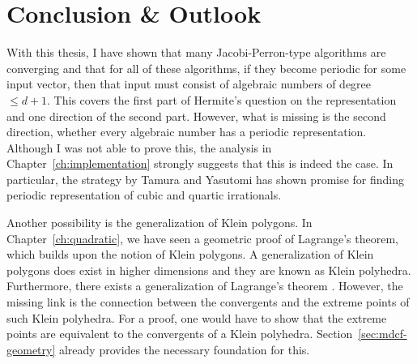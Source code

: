 \chapter{Conclusion \& Outlook}
\label{ch:conclusion}

With this thesis,
I have shown that many Jacobi-Perron-type algorithms are converging
and that for all of these algorithms,
if they become periodic for some input vector,
then that input must consist of algebraic numbers of degree $≤ d+1$.
This covers the first part of Hermite's question on the representation
and one direction of the second part.
However, what is missing is the second direction,
whether every algebraic number has a periodic representation.
Although I was not able to prove this,
the analysis in Chapter~\ref{ch:implementation} strongly suggests that this is
indeed the case.
In particular, the strategy by Tamura and Yasutomi has shown promise for
finding periodic representation of cubic and quartic irrationals.

Another possibility is the generalization of Klein polygons.
In Chapter~\ref{ch:quadratic},
we have seen a geometric proof of Lagrange's theorem,
which builds upon the notion of Klein polygons.
A generalization of Klein polygons does exist in higher dimensions
and they are known as Klein polyhedra.
Furthermore, there exists a generalization of Lagrange's theorem \cite{German08}.
However, the missing link is the connection between the convergents and the
extreme points of such Klein polyhedra.
For a proof, one would have to show that the extreme points are equivalent to
the convergents of a Klein polyhedra.
Section~\ref{sec:mdcf-geometry} already provides the necessary foundation for this.

